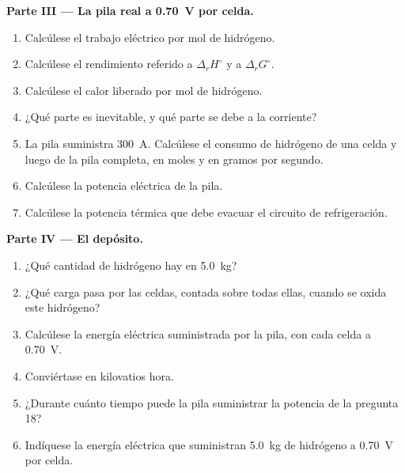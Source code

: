 \begin{problem}
\medskip
\noindent\textbf{Parte III --- La pila real a \qty{0.70}{V} por celda.}
\begin{enumerate}[resume]
  \item Calcúlese el trabajo eléctrico por mol de hidrógeno.
  \item Calcúlese el rendimiento referido a $\Delta_r H^\circ$ y a $\Delta_r G^\circ$.
  \item Calcúlese el calor liberado por mol de hidrógeno.
  \item ¿Qué parte es inevitable, y qué parte se debe a la corriente?
  \item La pila suministra \qty{300}{A}. Calcúlese el consumo de hidrógeno de una
        celda y luego de la pila completa, en moles y en gramos por segundo.
  \item Calcúlese la potencia eléctrica de la pila.
  \item Calcúlese la potencia térmica que debe evacuar el circuito de refrigeración.
\end{enumerate}

\medskip
\noindent\textbf{Parte IV --- El depósito.}
\begin{enumerate}[resume]
  \item ¿Qué cantidad de hidrógeno hay en \qty{5.0}{kg}?
  \item ¿Qué carga pasa por las celdas, contada sobre todas ellas, cuando
        se oxida este hidrógeno?
  \item Calcúlese la energía eléctrica suministrada por la pila, con cada celda a
        \qty{0.70}{V}.
  \item Conviértase en kilovatios hora.
  \item ¿Durante cuánto tiempo puede la pila suministrar la potencia de la pregunta 18?
  \item Indíquese la energía eléctrica que suministran \qty{5.0}{kg} de hidrógeno a
        \qty{0.70}{V} por celda.
\end{enumerate}
\end{problem}
